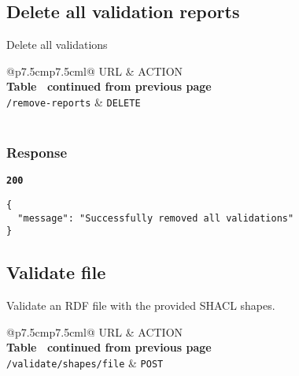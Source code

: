 \subsection{Delete all validation reports}
Delete all validations

\begin{longtable}[c]{@{}p{7.5cm}p{7.5cm}l@{}}
  \toprule
  URL                      & ACTION                           \\* \midrule
  \endfirsthead
  \multicolumn{3}{c}%
  {{\bfseries Table \thetable\ continued from previous page}} \\
  \endhead
  \bottomrule
  \endfoot
  \endlastfoot
  \texttt{/remove-reports} & \texttt{DELETE}                  \\* \bottomrule
  \label{tab:rdf-validator-delete-validations}                \\
\end{longtable}

\subsubsection{Response}
\textbf{\texttt{200}}
\begin{lstlisting}
{
  "message": "Successfully removed all validations"
}
\end{lstlisting}

\subsection{Validate file}
Validate an RDF file with the provided SHACL shapes.

\begin{longtable}[c]{@{}p{7.5cm}p{7.5cm}l@{}}
  \toprule
  URL                            & ACTION                     \\* \midrule
  \endfirsthead
  \multicolumn{3}{c}%
  {{\bfseries Table \thetable\ continued from previous page}} \\
  \endhead
  \bottomrule
  \endfoot
  \endlastfoot
  \texttt{/validate/shapes/file} & \texttt{POST}              \\* \bottomrule
  \label{tab:rdf-validator-file}                              \\
\end{longtable}

